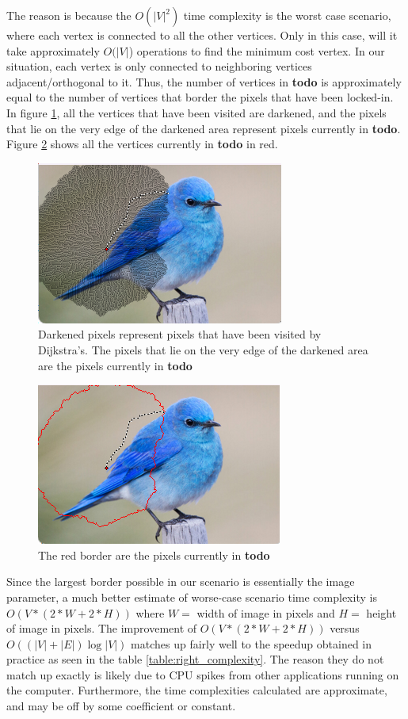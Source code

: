 \documentclass[11pt]{article}
\begin{document}
The reason is because the $O(|V|^2)$ time complexity is the worst case scenario, where each vertex is connected to all the other vertices. Only in this case, will it take approximately $O(|V|$) operations to find the minimum cost vertex. In our situation, each vertex is only connected to neighboring vertices adjacent/orthogonal to it. Thus, the number of vertices in \textbf{todo} is approximately equal to the number of vertices that border the pixels that have been locked-in. In figure \ref{fig:visited_show}, all the vertices that have been visited are darkened, and the pixels that lie on the very edge of the darkened area represent pixels currently in \textbf{todo}. Figure \ref{fig:todo_show} shows all the vertices currently in \textbf{todo} in red.

\begin{figure}[H]
	\centering
	\includegraphics{show_visited.png}
	\caption{\label{fig:visited_show} Darkened pixels represent pixels that have been visited by Dijkstra's. The pixels that lie on the very edge of the darkened area are the pixels currently in \textbf{todo}}
\end{figure}

\begin{figure}[H]
	\centering
	\includegraphics{todo_vis.png}
	\caption{\label{fig:todo_show} The red border are the pixels currently in \textbf{todo}}
\end{figure}

Since the largest border possible in our scenario is essentially the image parameter, a much better estimate of worse-case scenario time complexity is $O(V*(2*W+2*H))$ where $W=$ width of image in pixels and $H=$ height of image in pixels. The improvement of $O(V*(2*W+2*H))$ versus $O((|V|+|E|)\log|V|)$ matches up fairly well to the speedup obtained in practice as seen in the table \ref{table:right_complexity}. The reason they do not match up exactly is likely due to CPU spikes from other applications running on the computer. Furthermore, the time complexities calculated are approximate, and may be off by some coefficient or constant.
\end{document}
